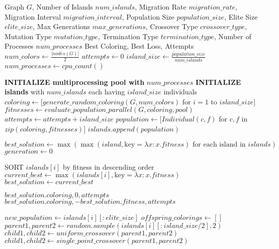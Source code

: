 \documentclass{article}
\begin{document}
\begin{algorithm}
    \caption{Island Model Genetic Algorithm for Graph Coloring}
    \begin{algorithmic}[1]
    \REQUIRE Graph $G$, Number of Islands $num\_islands$, Migration Rate $migration\_rate$, Migration Interval $migration\_interval$, Population Size $population\_size$, Elite Size $elite\_size$, Max Generations $max\_generations$, Crossover Type $crossover\_type$, Mutation Type $mutation\_type$, Termination Type $termination\_type$, Number of Processes $num\_processes$
    \ENSURE Best Coloring, Best Loss, Attempts
    \STATE $num\_colors \gets \frac{|nodes(G)|}{2}$
    \STATE $attempts \gets 0$
    \STATE $island\_size \gets \frac{population\_size}{num\_islands}$
        \STATE $num\_processes \gets cpu\_count()$
    \ENDIF
    
    \STATE \textbf{INITIALIZE multiprocessing pool with} $num\_processes$
    \STATE \textbf{INITIALIZE islands} with $num\_islands$ each having $island\_size$ individuals
        \STATE $coloring \gets [generate\_random\_coloring(G, num\_colors)$ for $i = 1$ to $island\_size]$
        \STATE $fitnesses \gets evaluate\_population\_parallel(G, coloring, pool)$
        \STATE $attempts \gets attempts + island\_size$
        \STATE $population \gets [Individual(c, f)$ for $c, f$ in $zip(coloring, fitnesses)]$
        \STATE $islands.append(population)$
    \ENDFOR
    
    \STATE $best\_solution \gets \max(\max(island, \text{key} = \lambda x: x.fitness) \text{ for each island in } islands)$
    \STATE $generation \gets 0$
    
            \STATE SORT $islands[i]$ by fitness in descending order
            \STATE $current\_best \gets \max(islands[i], \text{key} = \lambda x: x.fitness)$
                \STATE $best\_solution \gets current\_best$
            \ENDIF
    
                \STATE \RETURN $best\_solution.coloring, 0, attempts$
            \ENDIF
                \STATE \RETURN $best\_solution.coloring, -best\_solution.fitness, attempts$
            \ENDIF
    
            \STATE $new\_population \gets islands[i][:elite\_size]$
            \STATE $offspring\_colorings \gets []$
                \STATE $parent1, parent2 \gets random.sample(islands[i][:island\_size / 2], 2)$
                    \STATE $child1, child2 \gets uniform\_crossover(parent1, parent2)$
                \ELSE
                    \STATE $child1, child2 \gets single\_point\_crossover(parent1, parent2)$
                \ENDIF
    

\end{algorithmic}
\end{algorithm}
\end{document}
